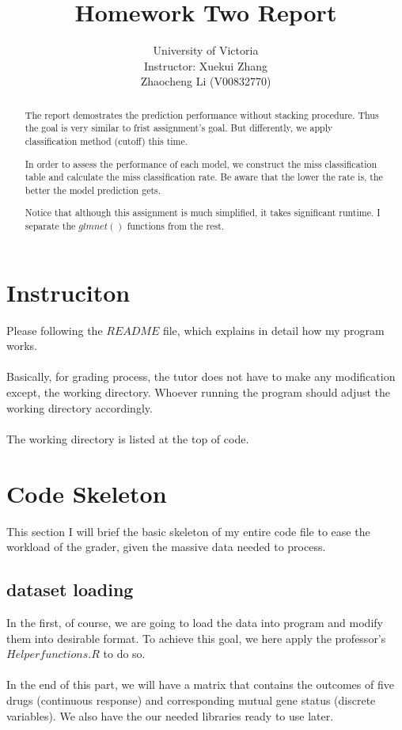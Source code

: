 \documentclass[12pt,letter]{article}
\title{Homework Two Report}
\author{University of Victoria\\Instructor: Xuekui Zhang\\Zhaocheng Li (V00832770)}
\begin{document}
\maketitle
\begin{abstract}
	The report demostrates the prediction performance without stacking procedure. Thus the goal is very similar to frist assignment's goal. But differently, we apply classification method (cutoff) this time.
	
	In order to assess the performance of each model, we construct the miss classification table and calculate the miss classification rate. Be aware that the lower the rate is, the better the model prediction gets.
	
	Notice that although this assignment is much simplified, it takes significant runtime. I separate the $glmnet()$ functions from the rest.
\end{abstract}
\section{Instruciton}
Please following the $README$ file, which explains in detail how my program works.\\
\vspace{1mm}\\
Basically, for grading process, the tutor does not have to make any modification except, the working directory. Whoever running the program should adjust the working directory accordingly. \\
\vspace{1mm}\\
The working directory is listed at the top of code.

\section{Code Skeleton}
This section I will brief the basic skeleton of my entire code file to ease the workload of the grader, given the massive data needed to process.
\subsection{dataset loading}
In the first, of course, we are going to load the data into program and modify them into desirable format. To achieve this goal, we here apply the professor's $Helperfunctions.R$ to do so.\\
\vspace{1mm}\\
In the end of this part, we will have a matrix that contains the outcomes of five drugs (continuous response) and corresponding mutual gene status (discrete variables). We also have the our needed libraries ready to use later.
\end{document}
